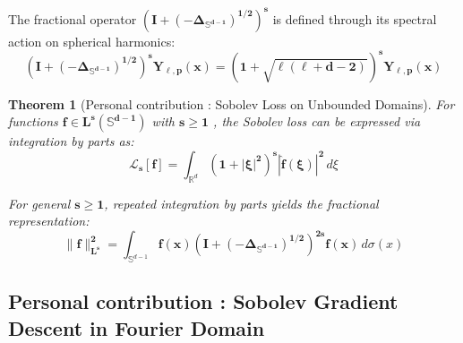 \documentclass[a4paper]{article}
\theoremstyle{plain}
\newtheorem{theorem}{Theorem}[section]
\theoremstyle{definition}
\theoremstyle{remark}
\begin{document}
\begin{tcolorbox}[colback=green!5,colframe=blue!60!black,title=Spectral Action]
The fractional operator $\boldsymbol{(I + (-\Delta_{\mathbb{S}^{d-1}})^{1/2})^s}$ is defined through its spectral action on spherical harmonics:
\begin{equation}
\label{eq:fractional_spectral}
\boldsymbol{(I + (-\Delta_{\mathbb{S}^{d-1}})^{1/2})^s Y_{\ell,p}(x)} = \boldsymbol{(1 + \sqrt{\ell(\ell + d - 2)})^s Y_{\ell,p}(x)}
\end{equation}
\end{tcolorbox}

\begin{theorem}[Personal contribution : Sobolev Loss on Unbounded Domains]
\label{thm:sobolev_unbounded}
For functions $\boldsymbol{f \in L^s(\mathbb{S}^{d-1})}$ with $\boldsymbol{s \geq 1}$ , the Sobolev loss can be expressed via integration by parts as:
\begin{equation}
\label{eq:sobolev_unbounded}
\boldsymbol{\mathcal{L}_s[f]} = \int_{\mathbb{R}^d} \boldsymbol{(1 + |\xi|^2)^s} \boldsymbol{|\hat{f}(\xi)|^2} \, d\xi
\end{equation}

For general $\boldsymbol{s \geq 1}$, repeated integration by parts yields the fractional representation:
\begin{equation}
\label{eq:sobolev_general}
\boldsymbol{\|f\|_{L^s}^2} = \int_{\mathbb{S}^{d-1}} \boldsymbol{f(x)} \boldsymbol{(I + (-\Delta_{\mathbb{S}^{d-1}})^{1/2})^{2s}} \boldsymbol{f(x)} \, d\sigma(x)
\end{equation}
\end{theorem}


\subsection{Personal contribution : Sobolev Gradient Descent in Fourier Domain}
\end{document}
